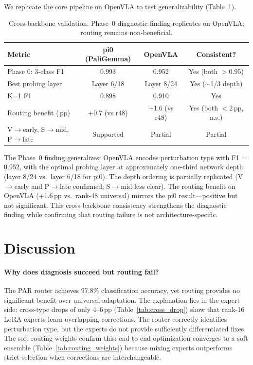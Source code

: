 \documentclass[letterpaper]{article}
\newcommand{\pp}{\,\text{pp}}
\begin{document}
We replicate the core pipeline on OpenVLA to test generalizability (Table~\ref{tab:cross_backbone}).

\begin{table}[h]
\centering
\caption{Cross-backbone validation. Phase~0 diagnostic finding replicates on OpenVLA; routing remains non-beneficial.}
\label{tab:cross_backbone}
\small
\begin{tabular}{lccc}
\toprule
\textbf{Metric} & \textbf{pi0 (PaliGemma)} & \textbf{OpenVLA} & \textbf{Consistent?} \\
\midrule
Phase 0: 3-class F1 & 0.993 & 0.952 & Yes (both $>$0.95) \\
Best probing layer & Layer 6/18 & Layer 8/24 & Yes ($\sim$1/3 depth) \\
K=1 F1 & 0.898 & 0.910 & Yes \\
Routing benefit ($\pp$) & +0.7 (vs r48) & +1.6 (vs r48) & Yes (both $<$2$\pp$, n.s.) \\
V$\to$early, S$\to$mid, P$\to$late & Supported & Partial & Partial \\
\bottomrule
\end{tabular}
\end{table}

The Phase~0 finding generalizes: OpenVLA encodes perturbation type with F1 = 0.952, with the optimal probing layer at approximately one-third network depth (layer 8/24 vs.\ layer 6/18 for pi0). The depth ordering is partially replicated (V$\to$early and P$\to$late confirmed; S$\to$mid less clear). The routing benefit on OpenVLA (+1.6$\pp$ vs.\ rank-48 universal) mirrors the pi0 result---positive but not significant. This cross-backbone consistency strengthens the diagnostic finding while confirming that routing failure is not architecture-specific.

\section{Discussion}
\label{sec:discussion}

\paragraph{Why does diagnosis succeed but routing fail?}
The PAR router achieves 97.8\% classification accuracy, yet routing provides no significant benefit over universal adaptation. The explanation lies in the expert side: cross-type drops of only 4--6$\pp$ (Table~\ref{tab:cross_drop}) show that rank-16 LoRA experts learn overlapping corrections. The router correctly identifies perturbation type, but the experts do not provide sufficiently differentiated fixes. The soft routing weights confirm this: end-to-end optimization converges to a soft ensemble (Table~\ref{tab:routing_weights}) because mixing experts outperforms strict selection when corrections are interchangeable.
\end{document}
